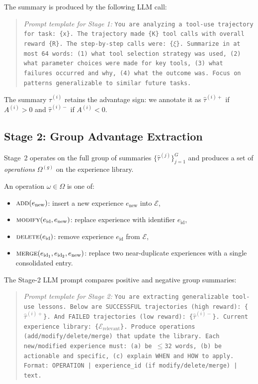 The summary is produced by the following LLM call:

\begin{quote}
\textit{Prompt template for Stage 1:}
\texttt{You are analyzing a tool-use trajectory for task: \{x\}. The
trajectory made \{K\} tool calls with overall reward \{R\}. The step-by-step
calls were: \{$\xi$\}. Summarize in at most 64 words: (1) what tool selection
strategy was used, (2) what parameter choices were made for key tools, (3) what
failures occurred and why, (4) what the outcome was. Focus on patterns
generalizable to similar future tasks.}
\end{quote}

The summary $\hat{\tau}^{(i)}$ retains the advantage sign: we annotate it as
$\hat{\tau}^{(i)+}$ if $A^{(i)} > 0$ and $\hat{\tau}^{(i)-}$ if $A^{(i)} < 0$.

\subsection{Stage 2: Group Advantage Extraction}
\label{sec:stage2}

Stage~2 operates on the full group of summaries $\{\hat{\tau}^{(j)}\}_{j=1}^G$
and produces a set of \emph{operations} $\Omega^{(g)}$ on the experience library.

\begin{definition}
\label{def:operation}
An operation $\omega \in \Omega$ is one of:
\begin{itemize}[leftmargin=1.5em]
    \item $\textsc{add}(e_{\text{new}})$: insert a new experience $e_{\text{new}}$ into $\mathcal{E}$,
    \item $\textsc{modify}(e_{\text{id}}, e_{\text{new}})$: replace experience with identifier $e_{\text{id}}$,
    \item $\textsc{delete}(e_{\text{id}})$: remove experience $e_{\text{id}}$ from $\mathcal{E}$,
    \item $\textsc{merge}(e_{\text{id}_1}, e_{\text{id}_2}, e_{\text{new}})$: replace two near-duplicate
          experiences with a single consolidated entry.
\end{itemize}
\end{definition}

The Stage-2 LLM prompt compares positive and negative group summaries:

\begin{quote}
\textit{Prompt template for Stage 2:}
\texttt{You are extracting generalizable tool-use lessons. Below are
SUCCESSFUL trajectories (high reward): \{$\hat{\tau}^{(i)+}$\}. And FAILED
trajectories (low reward): \{$\hat{\tau}^{(i)-}$\}. Current experience library:
\{$\mathcal{E}_{\text{relevant}}$\}. Produce operations (add/modify/delete/merge)
that update the library. Each new/modified experience must: (a) be $\leq$32
words, (b) be actionable and specific, (c) explain WHEN and HOW to apply.
Format: OPERATION | experience\_id (if modify/delete/merge) | text.}
\end{quote}

